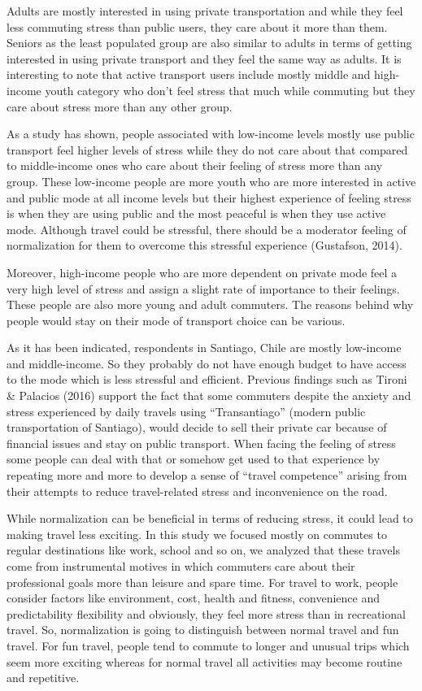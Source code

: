 \documentclass[
11pt, %
oneside, %
english, %
singlespacing, %
]{macthesis} %
\begin{document}
Adults are mostly interested in using private transportation and while they feel less commuting stress than public users, they care about it more than them. Seniors as the least populated group are also similar to adults in terms of getting interested in using private transport and they feel the same way as adults. It is interesting to note that active transport users include mostly middle and high-income youth category who don't feel stress that much while commuting but they care about stress more than any other group.

As a study has shown, people associated with low-income levels mostly use public transport feel higher levels of stress while they do not care about that compared to middle-income ones who care about their feeling of stress more than any group. These low-income people are more youth who are more interested in active and public mode at all income levels but their highest experience of feeling stress is when they are using public and the most peaceful is when they use active mode. Although travel could be stressful, there should be a moderator feeling of normalization for them to overcome this stressful experience (Gustafson, 2014).

Moreover, high-income people who are more dependent on private mode feel a very high level of stress and assign a slight rate of importance to their feelings. These people are also more young and adult commuters. The reasons behind why people would stay on their mode of transport choice can be various.

As it has been indicated, respondents in Santiago, Chile are mostly low-income and middle-income. So they probably do not have enough budget to have access to the mode which is less stressful and efficient. Previous findings such as Tironi \& Palacios (2016) support the fact that some commuters despite the anxiety and stress experienced by daily travels using ``Transantiago'' (modern public transportation of Santiago), would decide to sell their private car because of financial issues and stay on public transport. When facing the feeling of stress some people can deal with that or somehow get used to that experience by repeating more and more to develop a sense of ``travel competence'' arising from their attempts to reduce travel-related stress and inconvenience on the road.

While normalization can be beneficial in terms of reducing stress, it could lead to making travel less exciting. In this study we focused mostly on commutes to regular destinations like work, school and so on, we analyzed that these travels come from instrumental motives in which commuters care about their professional goals more than leisure and spare time. For travel to work, people consider factors like environment, cost, health and fitness, convenience and predictability flexibility and obviously, they feel more stress than in recreational travel. So, normalization is going to distinguish between normal travel and fun travel. For fun travel, people tend to commute to longer and unusual trips which seem more exciting whereas for normal travel all activities may become routine and repetitive.
\end{document}
